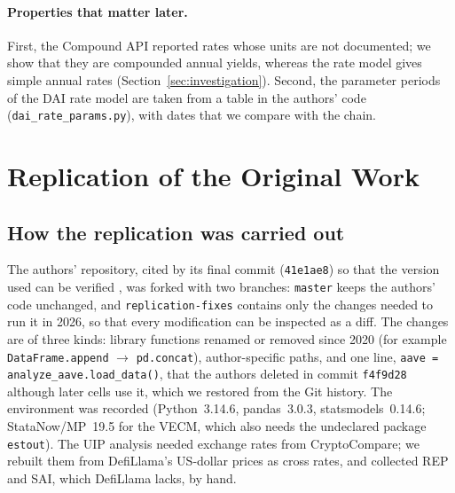 \documentclass[11pt]{article}
\begin{document}
\paragraph{Properties that matter later.} First, the Compound API reported rates whose units are not documented; we show that they are compounded annual yields, whereas the rate model gives simple annual rates (Section~\ref{sec:investigation}). Second, the parameter periods of the DAI rate model are taken from a table in the authors' code (\texttt{dai\_rate\_params.py}), with dates that we compare with the chain.

\section{Replication of the Original Work}
\label{sec:replication}

\subsection{How the replication was carried out}

The authors' repository, cited by its final commit (\texttt{41e1ae8}) so that the version used can be verified \citep{codata2013outofcite}, was forked with two branches: \texttt{master} keeps the authors' code unchanged, and \texttt{replication-fixes} contains only the changes needed to run it in 2026, so that every modification can be inspected as a diff. The changes are of three kinds: library functions renamed or removed since 2020 (for example \texttt{DataFrame.append} $\rightarrow$ \texttt{pd.concat}), author-specific paths, and one line, \texttt{aave = analyze\_aave.load\_data()}, that the authors deleted in commit \texttt{f4f9d28} although later cells use it, which we restored from the Git history. The environment was recorded (Python~3.14.6, pandas~3.0.3, statsmodels~0.14.6; StataNow/MP~19.5 for the VECM, which also needs the undeclared package \texttt{estout}). The UIP analysis needed exchange rates from CryptoCompare; we rebuilt them from DefiLlama's US-dollar prices as cross rates, and collected REP and SAI, which DefiLlama lacks, by hand.
\end{document}
